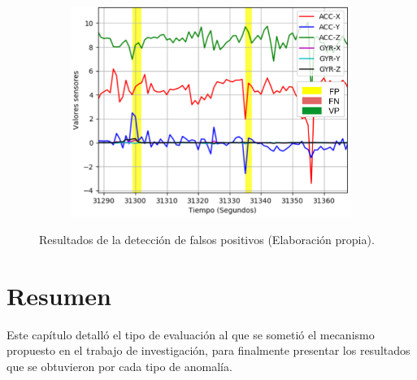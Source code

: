 \begin{figure}[H]
{\begin{varwidth}{\textwidth}
\begin{subfigure}[h]{0.45\textwidth}
            \includegraphics[width=\textwidth]{imagenes/Cap5/fp3}
        \end{subfigure} 
        \end{varwidth}}
        \caption{Resultados de la detecci\'{o}n de falsos positivos (Elaboraci\'{o}n propia).}
		\label{fig:resultados_falsos_positivos}
    \end{figure}

\section{Resumen}

Este cap\'{i}tulo detall\'{o} el tipo de evaluaci\'{o}n al que se someti\'{o} el mecanismo propuesto en el trabajo de investigaci\'{o}n, para finalmente presentar los resultados que se obtuvieron por cada tipo de anomal\'{i}a.
 
 